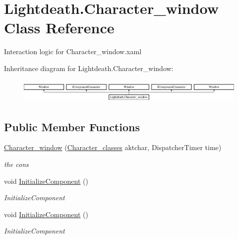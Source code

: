 \hypertarget{class_lightdeath_1_1_character__window}{}\section{Lightdeath.\+Character\+\_\+window Class Reference}
\label{class_lightdeath_1_1_character__window}


Interaction logic for Character\+\_\+window.\+xaml  


Inheritance diagram for Lightdeath.\+Character\+\_\+window\+:\begin{figure}[H]
\begin{center}
\leavevmode
\includegraphics[height=1.191489cm]{class_lightdeath_1_1_character__window}
\end{center}
\end{figure}
\subsection*{Public Member Functions}
\begin{DoxyCompactItemize}
\item 
\hyperlink{class_lightdeath_1_1_character__window_a0439a34c7f984c017b1680b1e6dded5f}{Character\+\_\+window} (\hyperlink{class_lightdeath_1_1_character__classes}{Character\+\_\+classes} aktchar, Dispatcher\+Timer time)
\begin{DoxyCompactList}\small\item\em the cons \end{DoxyCompactList}\item 
void \hyperlink{class_lightdeath_1_1_character__window_ad8d9797968e3c28a54dbf1c57ac1d59d}{Initialize\+Component} ()
\begin{DoxyCompactList}\small\item\em Initialize\+Component \end{DoxyCompactList}\item 
void \hyperlink{class_lightdeath_1_1_character__window_ad8d9797968e3c28a54dbf1c57ac1d59d}{Initialize\+Component} ()
\begin{DoxyCompactList}\small\item\em Initialize\+Component \end{DoxyCompactList}\end{DoxyCompactItemize}


